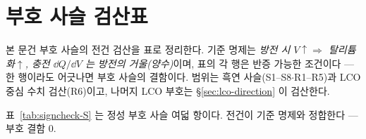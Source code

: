 \appendix
\section{부호 사슬 검산표}\label{sec:signcheck}
본 문건 부호 사슬의 전건 검산을 표로 정리한다. 기준 명제는 \emph{방전 시 $V\!\uparrow\Rightarrow$
탈리튬화$\uparrow$, 충전 $\dd Q/\dd V$ 는 방전의 거울(양수)}이며, 표의 각 행은 반증 가능한 조건이다 ---
한 행이라도 어긋나면 부호 사슬의 결함이다. 범위는 흑연 사슬(S1--S8$\cdot$R1--R5)과 LCO 중심 수치
검산(R6)이고, 나머지 LCO 부호는 \S\ref{sec:lco-direction} 이 검산한다.

표~\ref{tab:signcheck-S} 는 정성 부호 사슬 여덟 항이다. 전건이 기준 명제와 정합한다 --- 부호 결함 $0$.

